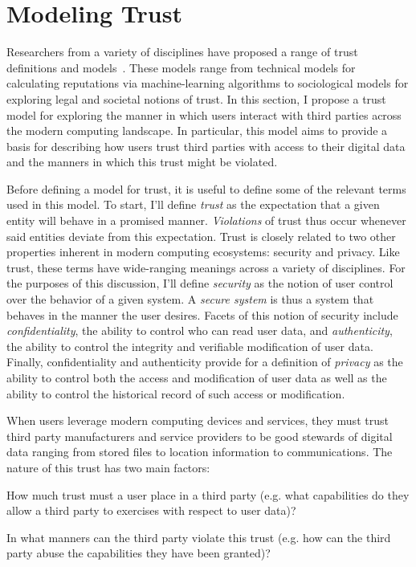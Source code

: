 \section{Modeling Trust}
\label{sec:model}

Researchers from a variety of disciplines have proposed a range of
trust definitions and models~\cite{grandison2000, camp2003,
  sabater2005, flowerday2006}. These models range from technical
models for calculating reputations via machine-learning algorithms to
sociological models for exploring legal and societal notions of
trust. In this section, I propose a trust model for exploring the
manner in which users interact with third parties across the modern
computing landscape. In particular, this model aims to provide a basis
for describing how users trust third parties with access to their
digital data and the manners in which this trust might be violated.

Before defining a model for trust, it is useful to define some of the
relevant terms used in this model. To start, I'll define
\textit{trust} as the expectation that a given entity will behave in a
promised manner. \textit{Violations} of trust thus occur whenever said
entities deviate from this expectation. Trust is closely related to
two other properties inherent in modern computing ecosystems: security
and privacy. Like trust, these terms have wide-ranging meanings across
a variety of disciplines. For the purposes of this discussion, I'll
define \textit{security} as the notion of user control over the
behavior of a given system. A \textit{secure system} is thus a system
that behaves in the manner the user desires. Facets of this notion of
security include \textit{confidentiality}, the ability to control who
can read user data, and \textit{authenticity}, the ability to control
the integrity and verifiable modification of user data. Finally,
confidentiality and authenticity provide for a definition of
\textit{privacy} as the ability to control both the access and
modification of user data as well as the ability to control the
historical record of such access or modification.

When users leverage modern computing devices and services, they must
trust third party manufacturers and service providers to be good
stewards of digital data ranging from stored files to location
information to communications. The nature of this trust has two main
factors:

\begin{packed_desc}
\item[Degree:] How much trust must a user place in a third party
  (e.g. what capabilities do they allow a third party to exercises with
  respect to user data)?
\item[Risk:] In what manners can the third party violate this trust
  (e.g. how can the third party abuse the capabilities they have been
  granted)?
\end{packed_desc}

